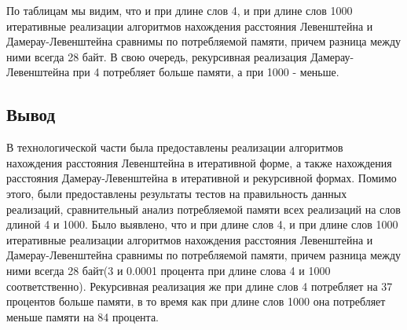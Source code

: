 \documentclass[a4paper,12pt]{report}
\begin{document}
	\begin{flushleft}
	По таблицам мы видим, что и при длине слов 4, и при длине слов 1000 итеративные реализации алгоритмов нахождения расстояния Левенштейна и Дамерау-Левенштейна сравнимы по потребляемой памяти, причем разница между ними всегда 28 байт. В свою очередь, рекурсивная реализация Дамерау-Левенштейна при 4 потребляет больше памяти, а при 1000 - меньше.
	\end{flushleft}
  \begin{center}
   \subsection{Вывод}
    \end{center}  
    
	В технологической части была предоставлены реализации алгоритмов нахождения расстояния Левенштейна в итеративной форме, а также нахождения расстояния Дамерау-Левенштейна в итеративной и рекурсивной формах. Помимо этого, были предоставлены результаты тестов на правильность данных реализаций, сравнительный анализ потребляемой памяти всех реализаций на слов длиной 4 и 1000. Было выявлено, что и при длине слов 4, и при длине слов 1000 итеративные реализации алгоритмов нахождения расстояния Левенштейна и Дамерау-Левенштейна сравнимы по потребляемой памяти, причем разница между ними всегда 28 байт(3 и 0.0001 процента при длине слова 4 и 1000 соответственно). Рекурсивная реализация же при длине слов 4 потребляет на 37 процентов больше памяти, в то время как при длине слов 1000 она потребляет меньше памяти на 84 процента.
\end{document}
